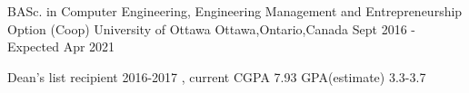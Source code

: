 

\begin{cventries}

  \cventry
    {BASc. in Computer Engineering, Engineering Management and Entrepreneurship Option (Coop)  } %
    {University of Ottawa} %
    {Ottawa,Ontario,Canada} %
    {Sept 2016 - Expected Apr 2021} %
    {
      \begin{cvitems} %
        \item {Dean's list recipient 2016-2017 , current CGPA 7.93 GPA(estimate) 3.3-3.7}
      \end{cvitems}
    }

     
\end{cventries}
